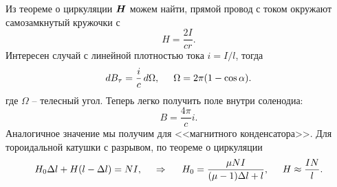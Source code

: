 Из теореме о циркуляции $\mbox{\boldmath $H$}$ можем найти, прямой провод с током окружают самозамкнутый кружочки с 
\begin{equation*}
    H = \frac{2I}{cr}.
\end{equation*}
Интересен случай с линейной плотностью тока $i = I/l$, тогда
\begin{equation*}
    d B_{\tau} = \frac{i}{c} \, d \Omega, \hspace{0.5cm} \Omega = 2 \pi (1 - \cos \alpha).
\end{equation*}
где $\Omega$ -- телесный угол. Теперь легко получить поле внутри соленодиа:
\begin{equation*}
    B = \frac{4\pi}{c} i.
\end{equation*}
Аналогичное значение мы получим для <<магнитного конденсатора>>.  Для тороидальной катушки с разрывом, по теореме о циркуляции
\begin{equation*}
    H_0 \Delta l + H (l-\Delta l) = NI, \hspace{0.5cm} \Rightarrow \hspace{0.5cm} 
    H_0 = \frac{\mu N I }{(\mu-1) \Delta l + l}, \hspace{0.5cm} H \approx \frac{IN}{l}.
\end{equation*}